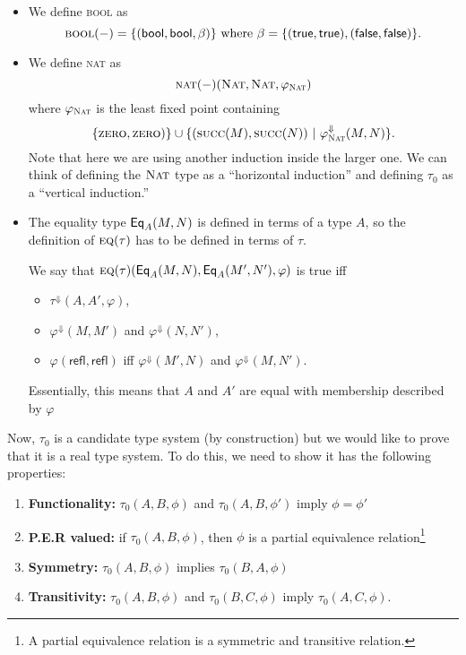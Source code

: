 \documentclass{article} \usepackage{chtt-notes} \usepackage{stmaryrd}
\begin{document}
\begin{itemize}
  \item We define \textsc{bool} as \[\textsc{bool}(-) = \{(\mathsf{bool}, \mathsf{bool}, \beta)\} \text{ where } \beta =
  \{(\mathsf{true}, \mathsf{true}), (\mathsf{false}, \mathsf{false})\}.\]

  \item We define \textsc{nat} as \[\textsc{nat}(-)(\textsc{Nat}, \textsc{Nat}, \varphi_{\textsc{Nat}})\] where
    $\varphi_\textsc{Nat}$ is the least fixed point containing
    \[ \{\textsc{zero}, \textsc{zero})\} \cup \{(\textsc{succ}(M), \textsc{succ}(N)) ~|~
    \varphi_\textsc{Nat}^\Downarrow(M, N) \}. \]
    Note that here we are using another induction inside the larger one. We can think of
    defining the $\textsc{Nat}$ type as a ``horizontal induction'' and defining $\tau_0$
    as a ``vertical induction.''

  \item The equality type $\mathsf{Eq}_{A}(M,N)$ is defined in terms of a type $A$, so the definition
      of $\textsc{eq}(\tau)$ has to be defined in terms of $\tau$.
      
      We say that $\textsc{eq}(\tau)(\mathsf{Eq}_{A}(M,N), \mathsf{Eq}_{A}(M',N'), \varphi)$ is true iff
      \begin{itemize}
      \item $\tau^\Downarrow(A, A', \varphi)$,
      \item $\varphi^\Downarrow(M,M')$ and $\varphi^\Downarrow(N,N')$,
      \item $\varphi(\textsf{refl}, \textsf{refl})$ iff $\varphi^\Downarrow(M',N)$ and
          $\varphi^\Downarrow(M,N')$.
      \end{itemize}

      Essentially, this means that $A$ and $A'$ are equal with membership
      described by $\varphi$

\end{itemize}

Now, $\tau_0$ is a candidate type system (by construction) but we would like to prove that
it is a real type system. To do this, we need to show it has the following properties:

\begin{enumerate}
\item \textbf{Functionality:} $\tau_0(A, B, \phi)$ and
  $\tau_0(A, B, \phi')$ imply $\phi = \phi'$
\item \textbf{\textsc{P.E.R} valued:} if $\tau_0(A, B, \phi)$, then
  $\phi$ is a partial equivalence relation\footnote{A partial
    equivalence relation is a symmetric and transitive relation.}
\item \textbf{Symmetry:} $\tau_0(A, B, \phi)$ implies $\tau_0(B, A, \phi)$
\item \textbf{Transitivity:} $\tau_0(A, B, \phi)$ and $\tau_0(B, C, \phi)$
  imply $\tau_0(A, C, \phi)$.
\end{enumerate}
\end{document}
